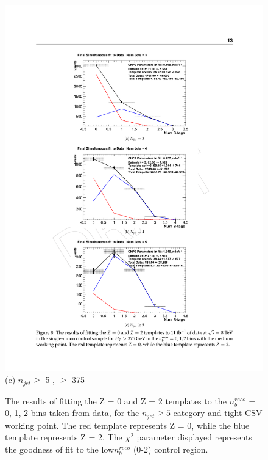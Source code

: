 \begin{figure}[ht]
\begin{minipage}[b]{0.48\linewidth}
\includegraphics[width = 1.0\linewidth]{plots/template_data_medium_njet5_highht.pdf}
\centering (c) $n_{jet} \geq$ 5 , \theht $\geq$ 375 
\end{minipage}
\caption[The results of fitting the Z = 0 and Z = 2 templates to the $n_{b}^{reco}$ = 0, 1, 2 bins taken directly from data, for the $n_{jet} \geq 5$ category and tight \ac{CSV} working point.]{The results of fitting the Z = 0 and Z = 2 templates to the $n_{b}^{reco}$ = 0, 1, 2 bins taken from data, for the $n_{jet} \geq 5$ category and tight \ac{CSV} working point. The red template represents Z = 0, while the blue template represents Z = 2. The $\chi^{2}$ parameter displayed represents the goodness of fit to the low$ n_{b}^{reco}$ (0-2) control region.}
\label{app:template_data_tight_njet5}
\end{figure}
